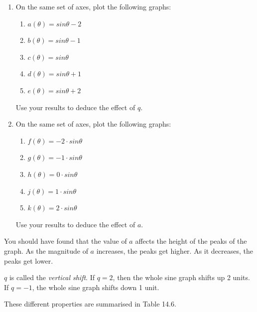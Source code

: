         \label{m39414*id84695}\begin{enumerate}[noitemsep, label=\textbf{\arabic*}. ] 
            \label{m39414*uid34}\item On the same set of axes, plot the following graphs:
\label{m39414*id84710}\begin{enumerate}[noitemsep, label=\textbf{\alph*}. ] 
            \label{m39414*uid35}\item $a\left(\theta \right)=sin\theta -2$\label{m39414*uid36}\item $b\left(\theta \right)=sin\theta -1$\label{m39414*uid37}\item $c\left(\theta \right)=sin\theta $\label{m39414*uid38}\item $d\left(\theta \right)=sin\theta +1$\label{m39414*uid39}\item $e\left(\theta \right)=sin\theta +2$\end{enumerate}
Use your results to deduce the effect of $q$.
\label{m39414*uid40}\item On the same set of axes, plot the following graphs:
\label{m39414*id84931}\begin{enumerate}[noitemsep, label=\textbf{\alph*}. ] 
            \label{m39414*uid41}\item $f\left(\theta \right)=-2\ensuremath{\cdot}sin\theta $\label{m39414*uid42}\item $g\left(\theta \right)=-1\ensuremath{\cdot}sin\theta $\label{m39414*uid43}\item $h\left(\theta \right)=0\ensuremath{\cdot}sin\theta $\label{m39414*uid44}\item $j\left(\theta \right)=1\ensuremath{\cdot}sin\theta $\label{m39414*uid45}\item $k\left(\theta \right)=2\ensuremath{\cdot}sin\theta $\end{enumerate}
Use your results to deduce the effect of $a$.
\end{enumerate}
        \label{m39414*id85165}You should have found that the value of $a$ affects the height of the peaks of the graph. As the magnitude of $a$ increases, the peaks get higher. As it decreases, the peaks get lower.\par 
        \label{m39414*id85188}$q$ is called the \textsl{vertical shift}. If $q=2$, then the whole sine graph shifts up 2 units. If $q=-1$, the whole sine graph shifts down 1 unit.\par 
        \label{m39414*id85237}These different properties are summarised in Table 14.6.\par 
        
